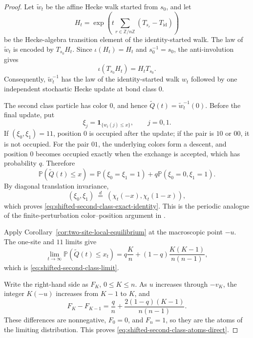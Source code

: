 \documentclass[11pt,a4paper]{amsart}
\theoremstyle{definition}
\theoremstyle{remark}
\numberwithin{equation}{section}
\newcommand{\Z}{\mathbb Z}
\newcommand{\Pp}{\mathbb P}
\newcommand{\one}{\mathbf 1}
\newcommand{\id}{\mathrm{id}}
\begin{document}
	\begin{proof}
		Let $\widetilde w_t$ be the affine Hecke walk started from $s_0$, and let
		\[
		H_t=\exp\left(t\sum_{r\in\Z/n\Z}(T_{s_r}-T_{\id})\right)
		\]
		be the Hecke-algebra transition element of the identity-started walk.  The
		law of $\widetilde w_t$ is encoded by $T_{s_0}H_t$.  Since
		$\iota(H_t)=H_t$ and $s_0^{-1}=s_0$, the anti-involution gives
		\begin{equation}\label{eq:shifted-inversion-algebra}
			\iota(T_{s_0}H_t)=H_tT_{s_0}.
		\end{equation}
		Consequently, $\widetilde w_t^{-1}$ has the law of the identity-started
		walk $w_t$ followed by one independent stochastic Hecke update at bond
		class $0$.
		
		The second class particle has color $0$, and hence
		$\widetilde Q(t)=\widetilde w_t^{-1}(0)$.  Before the final update, put
		\[
		\xi_j=\one_{\{w_t(j)\le x\}},
		\qquad j=0,1.
		\]
		If $(\xi_0,\xi_1)=11$, position $0$ is occupied after the update; if the
		pair is $10$ or $00$, it is not occupied.  For the pair $01$, the underlying
		colors form a descent, and position $0$ becomes occupied exactly when the
		exchange is accepted, which has probability $q$.  Therefore
		\[
		\Pp(\widetilde Q(t)\le x)
		=\Pp(\xi_0=\xi_1=1)+q\Pp(\xi_0=0,\xi_1=1).
		\]
		By diagonal translation invariance,
		\[
		(\xi_0,\xi_1)
		\ \stackrel d=\ 
		(\chi_t(-x),\chi_t(1-x)),
		\]
		which proves \eqref{eq:shifted-second-class-exact-identity}.  This is the
		periodic analogue of the finite-perturbation color--position argument in
		\cite[Section~5]{BorodinBufetovColorPosition}.
		
		Apply Corollary~\ref{cor:two-site-local-equilibrium} at the macroscopic
		point $-u$.  The one-site and $11$ limits give
		\[
		\lim_{t\to\infty}\Pp(\widetilde Q(t)\le x_t)
		=q\frac Kn+(1-q)\frac{K(K-1)}{n(n-1)},
		\]
		which is \eqref{eq:shifted-second-class-limit}.
		
		Write the right-hand side as $F_K$, $0\le K\le n$.  As $u$ increases
		through $-v_K$, the integer $K(-u)$ increases from $K-1$ to $K$, and
		\[
		F_K-F_{K-1}
		=\frac qn+\frac{2(1-q)(K-1)}{n(n-1)}.
		\]
		These differences are nonnegative, $F_0=0$, and $F_n=1$, so they are the
		atoms of the limiting distribution.  This proves
		\eqref{eq:shifted-second-class-atoms-direct}.
	\end{proof}
	
	
\end{document}
